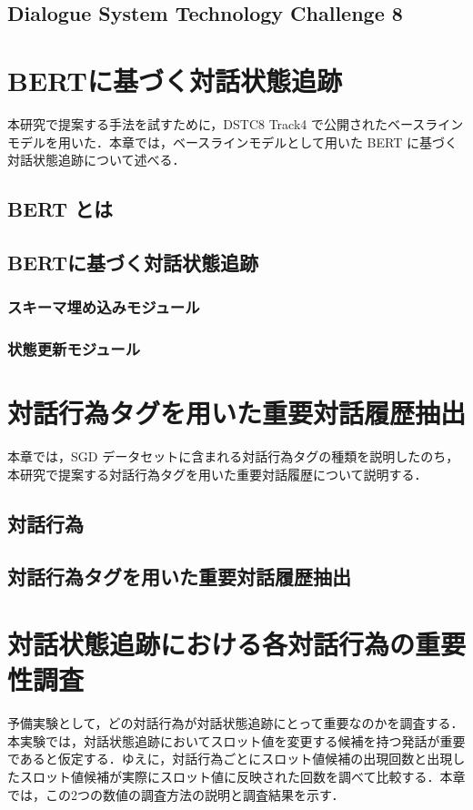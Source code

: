 \documentclass[12pt,frame,epsbox]{other/jmyreport}
\begin{document}
\section{Dialogue System Technology Challenge 8}

\chapter{BERTに基づく対話状態追跡}
本研究で提案する手法を試すために，DSTC8 Track4 で公開されたベースラインモデル\cite{baseline}を用いた．本章では，ベースラインモデルとして用いた BERT に基づく対話状態追跡について述べる．
\section{BERT とは}

\section{BERTに基づく対話状態追跡}

\subsection{スキーマ埋め込みモジュール}

\subsection{状態更新モジュール}

\chapter{対話行為タグを用いた重要対話履歴抽出}
本章では，SGD データセットに含まれる対話行為タグの種類を説明したのち，本研究で提案する対話行為タグを用いた重要対話履歴について説明する．
\section{対話行為}

\section{対話行為タグを用いた重要対話履歴抽出}

\chapter{対話状態追跡における各対話行為の重要性調査}
予備実験として，どの対話行為が対話状態追跡にとって重要なのかを調査する．本実験では，対話状態追跡においてスロット値を変更する候補を持つ発話が重要であると仮定する．ゆえに，対話行為ごとにスロット値候補の出現回数と出現したスロット値候補が実際にスロット値に反映された回数を調べて比較する．本章では，この2つの数値の調査方法の説明と調査結果を示す．
\end{document}
